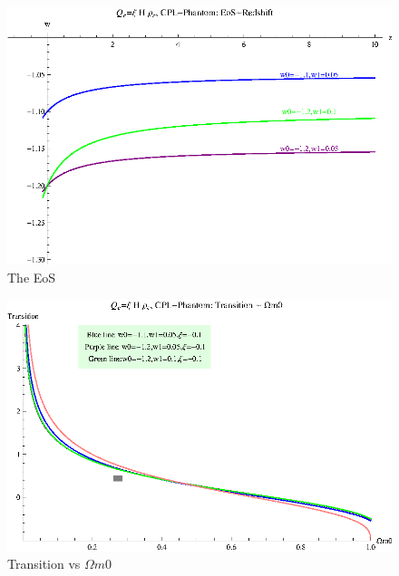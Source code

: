 \documentclass[12pt,a4paper]{article}
\begin{document}
\begin{figure}
\centering
\includegraphics[width=500pt]{rhoc_ICCPL_Phan_EoS.eps}
\caption{The EoS}\label{fig-rhoc_ICCPL_Phan_EoS}
\end{figure}

\begin{figure}
\centering
\includegraphics[width=500pt]{rhoc_ICCPL_Phan_TransVSOmegam0.eps}
\caption{Transition vs $\Omega m0$}\label{fig-rhoc_ICCPL_Phan_TransVSOmegam0}
\end{figure}
\end{document}
